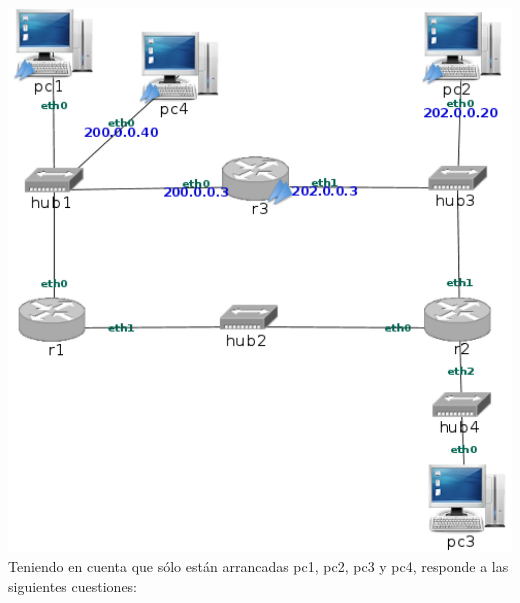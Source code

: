 \documentclass[12pt, a4paper]{report}
\begin{document}
\includegraphics*[scale=0.15, center]{enunciado1}
\newline
Teniendo en cuenta que sólo están arrancadas pc1, pc2, pc3 y pc4, responde a las siguientes cuestiones:
\end{document}
